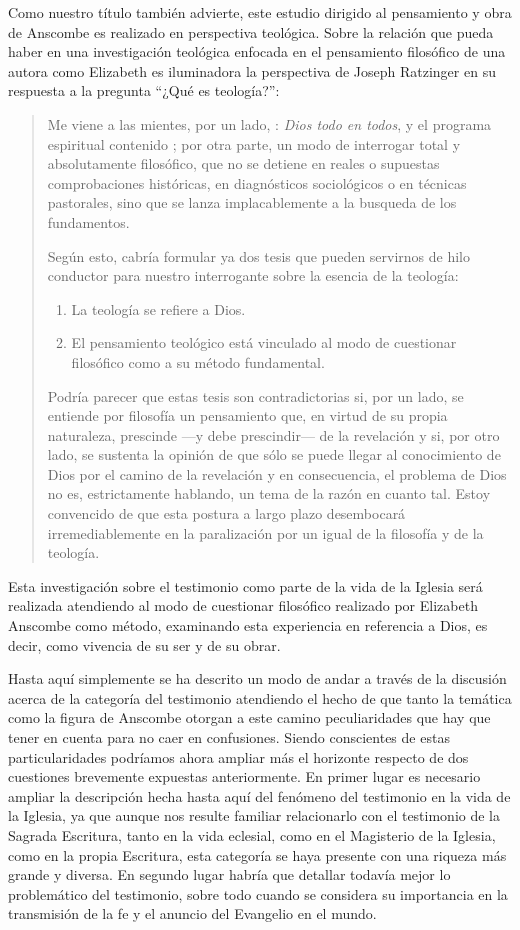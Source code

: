 Como nuestro título también advierte, este estudio dirigido al pensamiento y
obra de Anscombe es realizado en perspectiva teológica. Sobre la relación que
pueda haber en una investigación teológica enfocada en el pensamiento filosófico
de una autora como Elizabeth es iluminadora la perspectiva de Joseph Ratzinger
en su respuesta a la pregunta \enquote{¿Qué es teología?}:
\blockquote[{\cite[380]{ratzinger2005teoria}}]{Me viene a las mientes, por un
  lado, : \emph{Dios todo en todos}, y el programa
  espiritual contenido ; por otra parte, \textelp{} un modo de
  interrogar total y absolutamente filosófico, que no se detiene en reales o
  supuestas comprobaciones históricas, en diagnósticos sociológicos o en
  técnicas pastorales, sino que se lanza implacablemente a la busqueda de los
  fundamentos.

  Según esto, cabría formular ya dos tesis que pueden servirnos de hilo
  conductor para nuestro interrogante sobre la esencia de la teología:
  \begin{enumerate} 
    \item La teología se refiere a Dios.
    \item El pensamiento teológico está vinculado al modo de cuestionar
      filosófico como a su método fundamental.
   \end{enumerate}

  Podría parecer que estas tesis son contradictorias si, por un lado, se
  entiende por filosofía un pensamiento que, en virtud de su propia
  naturaleza, prescinde ---y debe prescindir--- de la revelación y si, por
  otro lado, se sustenta la opinión de que sólo se puede llegar al
  conocimiento de Dios por el camino de la revelación y en consecuencia, el
  problema de Dios no es, estrictamente hablando, un tema de la razón en
  cuanto tal. Estoy convencido de que esta postura \textelp{} a largo plazo
  desembocará irremediablemente en la paralización por un igual de la
  filosofía y de la teología.}
Esta investigación sobre el testimonio como parte de la vida de la Iglesia será
realizada atendiendo al modo de cuestionar filosófico realizado por Elizabeth
Anscombe como método, examinando esta experiencia en referencia a Dios, es
decir, como vivencia de su ser y de su obrar.

Hasta aquí simplemente se ha descrito un modo de andar a través de la discusión
acerca de la categoría del testimonio atendiendo el hecho de que tanto la
temática como la figura de Anscombe otorgan a este camino peculiaridades que hay
que tener en cuenta para no caer en confusiones. Siendo conscientes de estas
particularidades podríamos ahora ampliar más el horizonte respecto de dos
cuestiones brevemente expuestas anteriormente. En primer lugar es necesario
ampliar la descripción hecha hasta aquí del fenómeno del testimonio en la vida
de la Iglesia, ya que aunque nos resulte familiar relacionarlo con el testimonio
de la Sagrada Escritura, tanto en la vida eclesial, como en el Magisterio de la
Iglesia, como en la propia Escritura, esta categoría se haya presente con una
riqueza más grande y diversa. En segundo lugar habría que detallar todavía mejor
lo problemático del testimonio, sobre todo cuando se considera su importancia en
la transmisión de la fe y el anuncio del Evangelio en el mundo.
